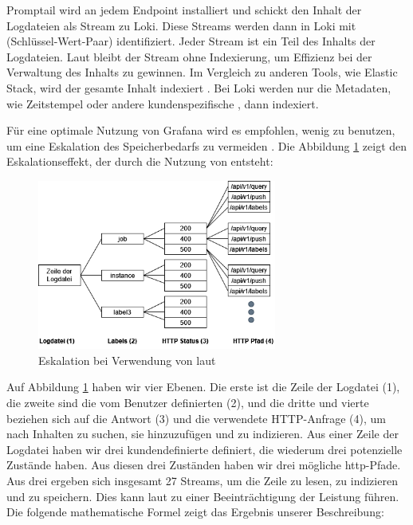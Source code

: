 Promptail wird an jedem \gls{Endpoint} installiert und schickt den Inhalt der Logdateien als Stream zu Loki. Diese Streams werden dann in Loki mit  (Schlüssel-Wert-Paar) identifiziert. Jeder Stream ist ein Teil des Inhalts der Logdateien. Laut \cite{Grafana_fundamentals} bleibt der Stream ohne Indexierung, um Effizienz bei der Verwaltung des Inhalts zu gewinnen. Im Vergleich zu anderen Tools, wie Elastic Stack, wird der gesamte Inhalt indexiert \citep{Anand_LokixELK}. Bei Loki werden nur die Metadaten, wie Zeitstempel oder andere kundenspezifische , dann indexiert.

Für eine optimale Nutzung von Grafana wird es empfohlen, wenig  zu benutzen, um eine Eskalation des Speicherbedarfs zu vermeiden \cite{Grafana_labels}. Die Abbildung \ref{fig:Eskalation_Labels} zeigt den Eskalationseffekt, der durch die Nutzung von  entsteht:

\begin{figure}[H]
   \centering
   \includegraphics[width=0.7\textwidth]{assets/labelstream.png}
   \caption[Eskalation bei Verwendung von ]
   {Eskalation bei Verwendung von  laut \cite{Grafana_labels}}
   \label{fig:Eskalation_Labels}
   \centering
 \end{figure}
 
Auf Abbildung \ref{fig:Eskalation_Labels} haben wir vier Ebenen. Die erste ist die Zeile der Logdatei (1), die zweite sind die vom Benutzer definierten  (2), und die dritte und vierte beziehen sich auf die Antwort (3) und die verwendete HTTP-Anfrage (4), um nach Inhalten zu suchen, sie hinzuzufügen und zu indizieren. Aus einer Zeile der Logdatei haben wir drei kundendefinierte  definiert, die wiederum drei potenzielle Zustände haben. Aus diesen drei Zuständen haben wir drei mögliche \gls{http}-Pfade. Aus drei  ergeben sich insgesamt 27 Streams, um die Zeile zu lesen, zu indizieren und zu speichern. Dies kann laut \cite{Grafana_labels} zu einer Beeinträchtigung der Leistung führen. Die folgende mathematische Formel zeigt das Ergebnis unserer Beschreibung:

